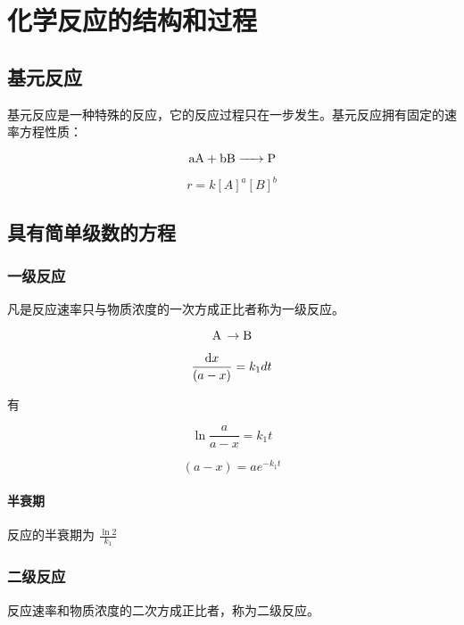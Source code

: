 \section{化学反应的结构和过程}

\subsection{基元反应}

基元反应是一种特殊的反应，它的反应过程只在一步发生。基元反应拥有固定的速率方程性质：

\begin{equation*}
    \ce{aA + bB -> P}
\end{equation*}

\begin{equation*}
    r = k[A]^a[B]^b
\end{equation*}

\subsection{具有简单级数的方程}

\subsubsection{一级反应}

凡是反应速率只与物质浓度的一次方成正比者称为一级反应。

\[
    \ce{A \rightarrow B}
\]

\[
    \frac{ \mathrm{d} x} {(a - x)} = k_1 dt
\]

有

\begin{equation*}
    \ln \frac{a}{a - x} = k_1 t
\end{equation*}

\begin{equation*}
    (a - x) = a e^{-k_1 t}
\end{equation*}


\paragraph{半衰期} 反应的半衰期为 $\frac{\ln 2}{k_1}$

\subsubsection{二级反应}

反应速率和物质浓度的二次方成正比者，称为二级反应。

